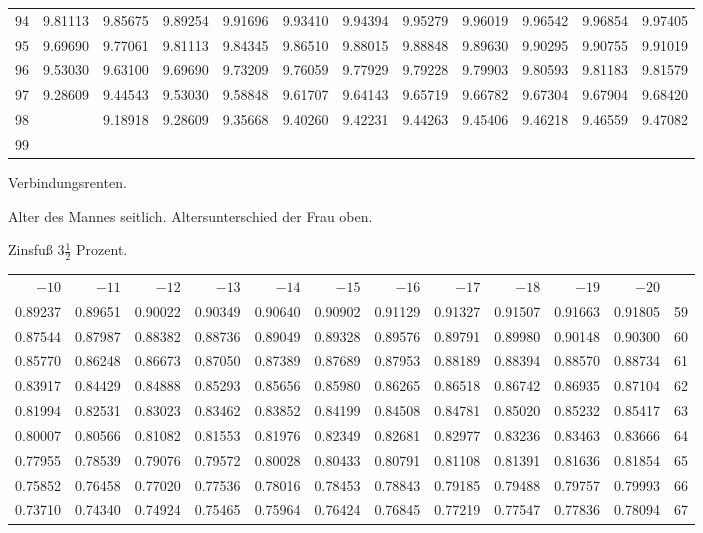 \begin{center}
\begin{tabular}{|r|rrrrrrrrrrr|}
94&9.81113&9.85675&9.89254&9.91696&9.93410&9.94394&9.95279&9.96019&9.96542&9.96854&9.97405\\[5pt]
95&9.69690&9.77061&9.81113&9.84345&9.86510&9.88015&9.88848&9.89630&9.90295&9.90755&9.91019\\
96&9.53030&9.63100&9.69690&9.73209&9.76059&9.77929&9.79228&9.79903&9.80593&9.81183&9.81579\\
97&9.28609&9.44543&9.53030&9.58848&9.61707&9.64143&9.65719&9.66782&9.67304&9.67904&9.68420\\
98&&9.18918&9.28609&9.35668&9.40260&9.42231&9.44263&9.45406&9.46218&9.46559&9.47082\\
99&&&&&&&&&&&\\
\hline\end{tabular}
\end{center}
\clearpage
{}
\begin{center}
Verbindungsrenten.\par\smallskip
Alter des Mannes seitlich. Altersunterschied der Frau oben.\par\smallskip
Zinsfuß \(3\tfrac{1}{2}\) Prozent.\par\medskip
\fontsize{8}{10}\selectfont\setlength{\tabcolsep}{1.3pt}
\begin{tabular}{|rrrrrrrrrrr|r|}
\hline
\(-10\)&\(-11\)&\(-12\)&\(-13\)&\(-14\)&\(-15\)&\(-16\)&\(-17\)&\(-18\)&\(-19\)&\(-20\)&\\[8pt]
0.89237&0.89651&0.90022&0.90349&0.90640&0.90902&0.91129&0.91327&0.91507&0.91663&0.91805&59\\
0.87544&0.87987&0.88382&0.88736&0.89049&0.89328&0.89576&0.89791&0.89980&0.90148&0.90300&60\\
0.85770&0.86248&0.86673&0.87050&0.87389&0.87689&0.87953&0.88189&0.88394&0.88570&0.88734&61\\
0.83917&0.84429&0.84888&0.85293&0.85656&0.85980&0.86265&0.86518&0.86742&0.86935&0.87104&62\\
0.81994&0.82531&0.83023&0.83462&0.83852&0.84199&0.84508&0.84781&0.85020&0.85232&0.85417&63\\
0.80007&0.80566&0.81082&0.81553&0.81976&0.82349&0.82681&0.82977&0.83236&0.83463&0.83666&64\\[5pt]
0.77955&0.78539&0.79076&0.79572&0.80028&0.80433&0.80791&0.81108&0.81391&0.81636&0.81854&65\\
0.75852&0.76458&0.77020&0.77536&0.78016&0.78453&0.78843&0.79185&0.79488&0.79757&0.79993&66\\
0.73710&0.74340&0.74924&0.75465&0.75964&0.76424&0.76845&0.77219&0.77547&0.77836&0.78094&67\\

\end{tabular}
\end{center}
